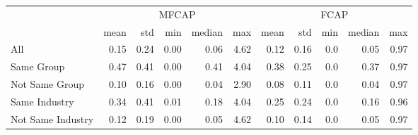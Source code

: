 \begin{tabular}{lrrrrrrrrrr}
\toprule
\multirow{2}{*}{}& \multicolumn{5}{c}{MFCAP} & \multicolumn{5}{c}{FCAP} \\
\cmidrule(lr){2-6} \cmidrule(lr){7-11}
&       mean &    std &    min & median &    max &         mean &    std &    min & median &    max \\
\midrule
All               &  0.15 &  0.24 &  0.00 &   0.06 &  4.62 &  0.12 &  0.16 &  0.0 &   0.05 &  0.97 \\
Same Group        &  0.47 &  0.41 &  0.00 &   0.41 &  4.04 &  0.38 &  0.25 &  0.0 &   0.37 &  0.97 \\
Not Same Group    &  0.10 &  0.16 &  0.00 &   0.04 &  2.90 &  0.08 &  0.11 &  0.0 &   0.04 &  0.97 \\
Same Industry     &  0.34 &  0.41 &  0.01 &   0.18 &  4.04 &  0.25 &  0.24 &  0.0 &   0.16 &  0.96 \\
Not Same Industry &  0.12 &  0.19 &  0.00 &   0.05 &  4.62 &  0.10 &  0.14 &  0.0 &   0.05 &  0.97 \\
\bottomrule
\end{tabular}
